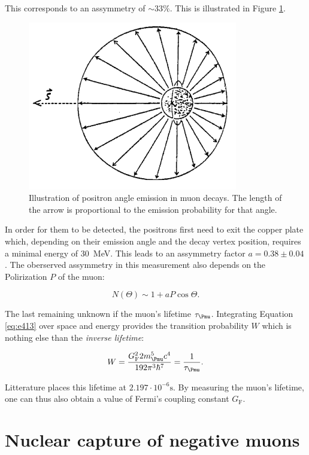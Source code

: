 This corresponds to an assymmetry of $\sim 33\%$. This is illustrated in Figure \ref{fig:emassy}.

\begin{figure}[htbp]
\centering
\includegraphics[width=0.7\linewidth]{./fig/emassy.png}
\caption{Illustration of positron angle emission in muon decays. The length of the arrow is proportional to the emission probability for that angle.}
\label{fig:emassy}
\end{figure}

In order for them to be detected, the positrons first need to exit the copper plate which, depending on their emission angle and the decay vertex position, requires a minimal energy of \SI{30}{\MeV}. This leads to an assymmetry factor $a=0.38\pm0.04$ \cite{Heel}. The oberserved assymmetry in this measurement also depends on the Polirization $P$ of the muon:

\begin{equation}
\label{eq:larg}
N(\Theta)\sim1+aP\cos{\Theta}.
\end{equation}

The last remaining unknown if the muon's lifetime $\tau_{\Pmu}$. Integrating Equation \ref{eq:e413} over space and energy provides the transition probability $W$ which is nothing else than the \textit{inverse lifetime}:

\begin{equation}
W=\frac{G^2_{\text{F}}2m_{\Pmu}^5c^4}{192\pi^3\hbar^7}=\frac{1}{\tau_{\Pmu}}.
\end{equation}

Litterature places this lifetime at $2.197\cdot 10^{-6} \si{\second}$. By measuring the muon's lifetime, one can thus also obtain a value of Fermi's coupling constant $G_{\text{F}}$.

\section{Nuclear capture of negative muons}

